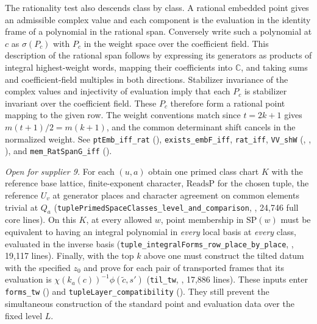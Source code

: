 The rationality test also descends class by class. A rational embedded
point gives an admissible complex value and each component is the
evaluation in the identity frame of a polynomial in the rational span.
Conversely write such a polynomial at $c$ as $\sigma(P_c)$ with $P_c$
in the weight space over the coefficient field. This description of the
rational span follows by expressing its generators as products of integral
highest-weight words, mapping their coefficients into $\mathbb C$, and
taking sums and coefficient-field multiples in both directions.
Stabilizer invariance of the complex values and injectivity of evaluation
imply that each $P_c$ is stabilizer invariant over the coefficient field.
These $P_c$ therefore form a rational point mapping to the given row.
The weight conventions match since $t=2k+1$ gives
$m(t+1)/2=m(k+1)$, and the common determinant shift cancels in the
normalized weight. See \nolinkurl{ptEmb_iff_rat}
(),
\nolinkurl{exists_embF_iff}, \nolinkurl{rat_iff}, \nolinkurl{VV_shW}
(, ,
), and \nolinkurl{mem_RatSpanG_iff}
().

\emph{Open for supplier 9.} For each $(u,a)$ obtain one primed class
chart $K$ with the reference base lattice, finite-exponent character,
$\mathrm{ReadsP}$ for the chosen tuple, the reference $U_v$ at generator
places and character agreement on common elements trivial at $Q_a$
(\nolinkurl{tuplePrimedSpaceClasses_level_and_comparison},
,
24,746 full core lines). On this $K$, at every allowed $w$, point
membership in $\mathrm{SP}(w)$ must be equivalent to having an integral
polynomial in \emph{every} local basis at \emph{every} class, evaluated in
the inverse basis (\nolinkurl{tuple_integralForms_row_place_by_place},
,
19,117 lines). Finally, with the top $k$ above one must construct the
tilted datum with the specified $z_0$ and prove for each pair of
transported frames that its evaluation is
$\chi(k_a(c))^{-1}\phi(\widetilde c,s')$
(\nolinkurl{til_tw}, , 17,886 lines).
These inputs enter \nolinkurl{forms_tw}
() and
\nolinkurl{tupleLayer_compatibility}
(). They still
prevent the simultaneous construction of the standard point and
evaluation data over the fixed level $L$.

